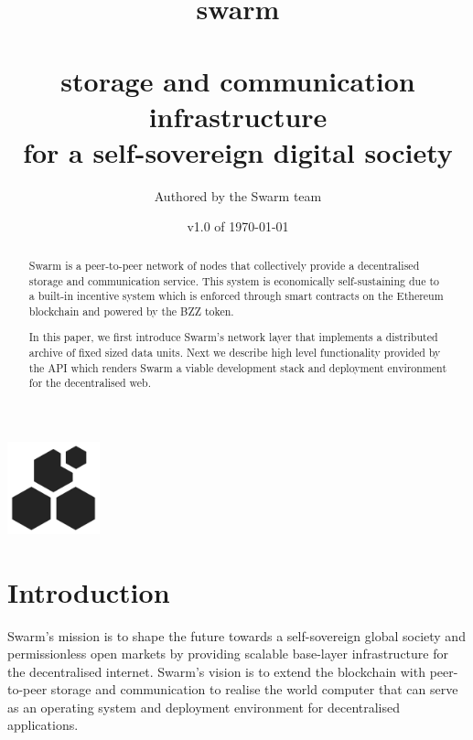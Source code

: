 \documentclass[12pt,a4paper]{article}
\title{\fontsize{42}\Huge\sc swarm\\\ \\
\vspace{1.5cm}
\Large storage and communication infrastructure\\ for a self-sovereign digital society}
\author{Authored by the Swarm team}
\date{v1.0 of \today}
\begin{document}
\maketitle
\vspace{.5cm}
\begin{center}
\includegraphics[width=0.2\textwidth]{fig/logo.pdf}
\end{center}
\vspace{1.5cm}
\noindent
\renewcommand{\abstractname}{}
\begin{abstract}
\noindent
Swarm is a peer-to-peer network of nodes that collectively provide a decentralised storage and communication service. This system is economically self-sustaining due to a built-in incentive system which is enforced through smart contracts on the Ethereum blockchain and powered by the BZZ token.

\noindent
In this paper, we first introduce Swarm's network layer that implements a distributed archive of fixed sized data units. Next we describe high level functionality provided by the API which renders Swarm a viable development stack and deployment environment for the decentralised web. 
    
\end{abstract}
\newpage
\tableofcontents
\section*{}
\listoffigures
\newpage
\section{Introduction}

Swarm’s mission is to shape the future towards a self-sovereign global society and permissionless open markets by providing scalable base-layer infrastructure for the decentralised internet. Swarm’s vision is to extend the blockchain with peer-to-peer storage and communication to realise the world computer that can serve as an operating system and deployment environment for decentralised applications.  
\end{document}
